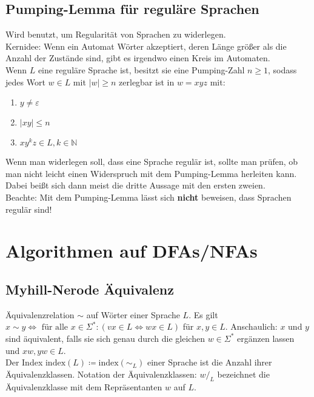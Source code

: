 \documentclass[11pt]{scrartcl}
\begin{document}
\subsection{Pumping-Lemma für reguläre Sprachen}

Wird benutzt, um Regularität von Sprachen zu widerlegen. \\

Kernidee: Wenn ein Automat Wörter akzeptiert, deren Länge größer als die Anzahl der Zustände sind, gibt es irgendwo einen Kreis im Automaten. \\

Wenn $L$ eine reguläre Sprache ist, besitzt sie eine Pumping-Zahl $n \geq 1$, sodass jedes Wort $w \in L$ mit $\vert w\vert \geq n$ zerlegbar ist in $w = xyz$ mit:
\begin{enumerate}
	\item{$y \neq \varepsilon$}
	\item{$|xy| \leq n$}
	\item{$xy^kz \in L, k \in \mathbb{N}$}
\end{enumerate}

Wenn man widerlegen soll, dass eine Sprache regulär ist, sollte man prüfen, ob man nicht leicht einen Widerspruch mit dem Pumping-Lemma herleiten kann. Dabei beißt sich dann meist die dritte Aussage mit den ersten zweien. \\

Beachte: Mit dem Pumping-Lemma lässt sich \textbf{nicht} beweisen, dass Sprachen regulär sind!

\section{Algorithmen auf DFAs/NFAs}

\subsection{Myhill-Nerode Äquivalenz}
Äquivalenzrelation $\sim$ auf Wörter einer Sprache $L$. Es gilt $x \sim y \Leftrightarrow \text{ für alle } x \in \Sigma^*: (vx \in L \Leftrightarrow wx \in L)$ für $x,y \in L$. Anschaulich: $x$ und $y$ sind äquivalent, falls sie sich genau durch die gleichen $w \in \Sigma^*$ ergänzen lassen und $xw, yw \in L$. \\

Der Index $\textrm{index}(L) \coloneqq \textrm{index}(\sim_L)$ einer Sprache ist die Anzahl ihrer Äquivalenzklassen. Notation der Äquivalenzklassen: $w/_L$ bezeichnet die Äquivalenzklasse mit dem Repräsentanten $w$ auf $L$. \\
\end{document}
